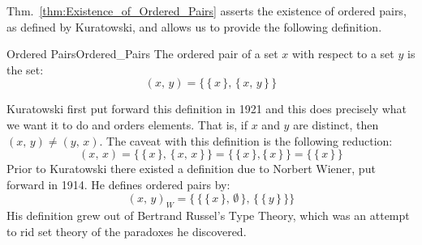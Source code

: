         Thm.~\ref{thm:Existence_of_Ordered_Pairs} asserts the existence of
        ordered pairs, as defined by Kuratowski, and allows us to provide
        the following definition.
        \begin{fdefinition}{Ordered Pairs}{Ordered_Pairs}
            The ordered pair of a set $x$ with respect to a set $y$ is the set:
            \begin{equation}
                (x,\,y)=\big\{\,\{\,x\,\},\,\{\,x,\,y\,\}\,\big\}
            \end{equation}
        \end{fdefinition}
        Kuratowski first put forward this definition in 1921 and this does
        precisely what we want it to do and orders elements. That is, if
        $x$ and $y$ are distinct, then $(x,\,y)\ne(y,\,x)$. The caveat with
        this definition is the following reduction:
        \begin{equation}
            (x,\,x)
            =\big\{\,\{\,x\,\},\,\{\,x,\,x\,\}\,\big\}
            =\big\{\,\{\,x\,\},\{\,x\,\}\,\big\}
            =\big\{\,\{\,x\,\}\,\big\}
        \end{equation}
        Prior to Kuratowski there existed a definition due to Norbert Wiener,
        put forward in 1914. He defines ordered pairs by:
        \begin{equation}
            (x,\,y)_{W}=\Big\{\,\big\{\,\{\,x\,\},\,\emptyset\,\big\},\,
                                \big\{\,\{\,y\,\}\,\big\}\Big\}
        \end{equation}
        His definition grew out of Bertrand Russel's Type Theory, which was
        an attempt to rid set theory of the paradoxes he discovered.
